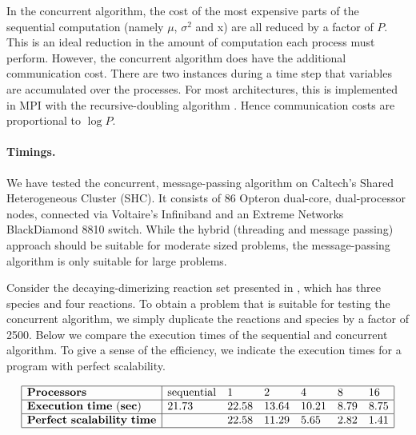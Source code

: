 \documentclass{article}
\begin{document}


In the concurrent algorithm, the cost of the most expensive parts of
the sequential computation (namely $\mu$, $\sigma^2$ and x) are all
reduced by a factor of $P$.  This is an ideal reduction in the amount
of computation each process must perform.  However, the concurrent
algorithm does have the additional communication cost.  There are two
instances during a time step that variables are accumulated over the
processes.  For most architectures, this is implemented in MPI with
the recursive-doubling algorithm \cite{vandevelde}.
Hence communication costs are proportional to $\log P$.


\paragraph{Timings.}
We have tested the concurrent, message-passing algorithm on Caltech's
Shared Heterogeneous Cluster (SHC).  It consists of 86 Opteron
dual-core, dual-processor nodes, connected via Voltaire's Infiniband
and an Extreme Networks BlackDiamond 8810 switch.  While the hybrid
(threading and message passing) approach should be suitable for moderate
sized problems, the message-passing algorithm is only suitable for 
large problems.  

Consider the decaying-dimerizing reaction set presented in 
\cite{gillespie2001},
which has three species and four reactions.
To obtain a problem that is suitable for testing the concurrent 
algorithm, we simply duplicate the reactions and species by a factor of 2500.
Below we compare the execution times of the sequential and 
concurrent algorithm.  To give a sense of the efficiency, we indicate the
execution times for a program with perfect scalability.

\[
\begin{array}{|l|llllll|}
\hline %
\mathrm{\bf{Processors}} &
\mathrm{sequential} &
1 &
2 &
4 &
8 &
16 \\
\hline %
\mathrm{\bf{Execution\ time\ (sec)}} &
21.73 &
22.58 &
13.64 &
10.21 &
8.79 &
8.75 \\
\hline %
\mathrm{\bf{Perfect\ scalability\ time}} &
  &
22.58 &
11.29 &
5.65 &
2.82 &
1.41 \\
\hline %
\end{array}
\]
\end{document}
